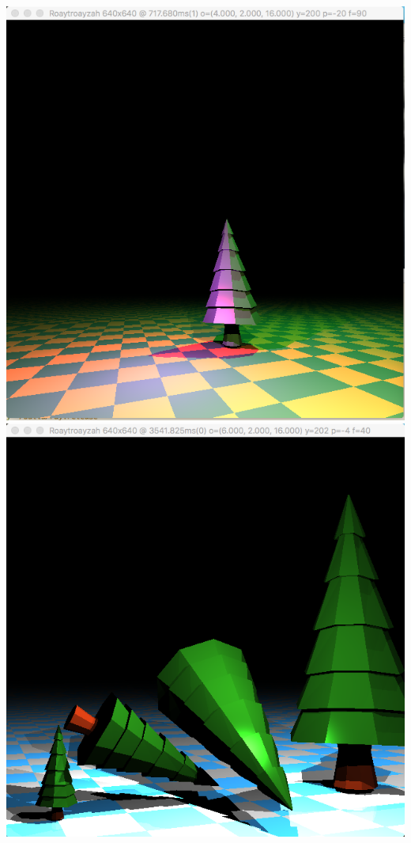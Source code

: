 \includegraphics[width=\textwidth]{img/colourLitTree}
\includegraphics[width=\textwidth]{img/fallingTrees}
